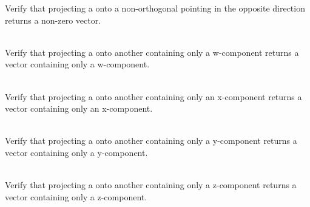 \begin{DoxyRefList}
\label{test__test000133}%
%
Verify that projecting a  onto a non-\/orthogonal  pointing in the opposite direction returns a non-\/zero vector.  
\item[{\parbox[t]{\linewidth}{Member \doxylink{group___f_g_m___vec4___proj_ga8f8dc73c13c6ce9bb70a24dfb5cbe8fa}{Vector4\+DProjection\+\_\+\+Projection\+Onto\+WAxis\+Returns\+Vector\+With\+Only\+WComponent} ()}}]\hfill \\
\label{test__test000129}%
%
Verify that projecting a  onto another  containing only a w-\/component returns a vector containing only a w-\/component.  
\item[{\parbox[t]{\linewidth}{Member \doxylink{group___f_g_m___vec4___proj_ga35d5fbb770050eee83448ee9775f324b}{Vector4\+DProjection\+\_\+\+Projection\+Onto\+XAxis\+Returns\+Vector\+With\+Only\+XComponent} ()}}]\hfill \\
\label{test__test000126}%
%
Verify that projecting a  onto another  containing only an x-\/component returns a vector containing only an x-\/component.  
\item[{\parbox[t]{\linewidth}{Member \doxylink{group___f_g_m___vec4___proj_ga8a2a41830269b98d66ffa9a48171809e}{Vector4\+DProjection\+\_\+\+Projection\+Onto\+YAxis\+Returns\+Vector\+With\+Only\+YComponent} ()}}]\hfill \\
\label{test__test000127}%
%
Verify that projecting a  onto another  containing only a y-\/component returns a vector containing only a y-\/component.  
\item[{\parbox[t]{\linewidth}{Member \doxylink{group___f_g_m___vec4___proj_ga62a50693d79508d4425d90c936181485}{Vector4\+DProjection\+\_\+\+Projection\+Onto\+ZAxis\+Returns\+Vector\+With\+Only\+ZComponent} ()}}]\hfill \\
\label{test__test000128}%
%
Verify that projecting a  onto another  containing only a z-\/component returns a vector containing only a z-\/component.  

\end{DoxyRefList}
